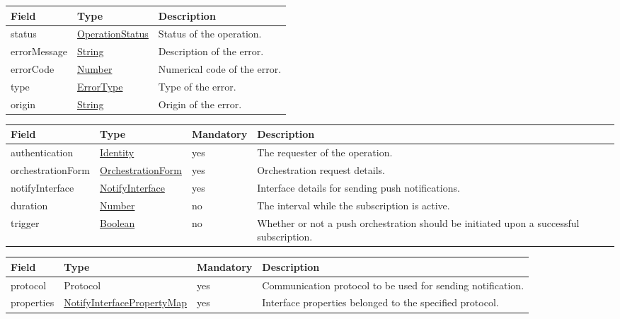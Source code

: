 \documentclass[a4paper]{arrowhead}
\newcommand{\pdef}[1]{{\textcolor{ArrowheadGrey}{#1\label{sec:model:primitives:#1}\label{sec:model:primitives:#1s}\label{sec:model:primitives:#1es}}}}
\newcommand{\pref}[1]{{\textcolor{ArrowheadGrey}{\hyperref[sec:model:primitives:#1]{#1}}}}
\begin{document}

\begin{table}[ht!]
\begin{tabularx}{\textwidth}{| p{4.25cm} | p{3.5cm} | X |} \hline
\rowcolor{gray!33} Field & Type      & Description \\ \hline
status & \pref{OperationStatus} & Status of the operation. \\ \hline
errorMessage & \pref{String} & Description of the error. \\ \hline
errorCode &\pref{Number}  & Numerical code of the error. \\ \hline
type & \pref{ErrorType} & Type of the error. \\ \hline
origin & \pref{String} & Origin of the error. \\ \hline
\end{tabularx}
\end{table}


\begin{table}[ht!]
\begin{tabularx}{\textwidth}{| p{3.2cm} | p{3.5cm} | p{2cm} | X |} \hline
\rowcolor{gray!33} Field & Type & Mandatory & Description \\ \hline
authentication & \hyperref[sec:model:Identity]{Identity} & yes & The requester of the operation. \\ \hline
orchestrationForm & \hyperref[sec:model:OrchestrationForm]{OrchestrationForm} & yes & Orchestration request details. \\ \hline
notifyInterface & \hyperref[sec:model:NotifyInterface]{NotifyInterface} & yes & Interface details for sending push notifications. \\ \hline
duration & \pref{Number} & no & The interval while the subscription is active.  \\ \hline
trigger & \pref{Boolean} & no & Whether or not a push orchestration should be initiated upon a successful subscription.  \\ \hline
\end{tabularx}
\end{table}


\begin{table}[ht!]
\begin{tabularx}{\textwidth}{| p{3.2cm} | p{4.3cm} | p{2cm} | X |} \hline
\rowcolor{gray!33} Field & Type & Mandatory & Description \\ \hline
protocol & \pdef{Protocol} & yes & Communication protocol to be used for sending notification. \\ \hline
properties & \hyperref[sec:model:NotifyInterfacePropertyMap]{NotifyInterfacePropertyMap} & yes & Interface properties belonged to the specified protocol. \\ \hline
\end{tabularx}
\end{table}
\end{document}
